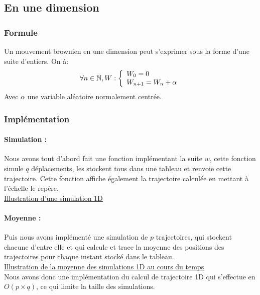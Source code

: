 \documentclass[10pt,a4paper]{article}
\begin{document}
\subsection{En une dimension}

\subsubsection{Formule}
Un mouvement brownien en une dimension peut s'exprimer sous la forme d'une suite d'entiers.
On à:
$$
\forall n \in \mathbb{N},\\
W : \left\{\begin{array}{ll}
        W_0 = 0\\
        W_{n+1} = W_n + \alpha
    \end{array}
    \right.
$$
Avec $\alpha$ une variable aléatoire normalement centrée.
\subsubsection{Implémentation}


\paragraph{Simulation : }

Nous avons tout d'abord fait une fonction implémentant la suite $w$, cette fonction simule $q$ déplacements, 
les stockent tous dans une tableau et renvoie cette trajectoire.
Cette fonction affiche également la trajectoire calculée en mettant à l'échelle le repère.
\\
\hyperref[figure1]{Illustration d'une simulation 1D}
\\

\paragraph{Moyenne : }

Puis nous avons implémenté une simulation de $p$ trajectoires, qui stockent chacune d'entre elle et 
qui calcule et trace la moyenne des positions des trajectoires pour chaque instant stocké dans le tableau.
\\
\hyperref[figure2]{Illustration de la moyenne des simulations 1D au cours du temps}
\\

Nous avons donc une implémentation du calcul de trajectoire 1D qui s'effectue en $O(p \times q)$,
ce qui limite la taille des simulations.
\end{document}
